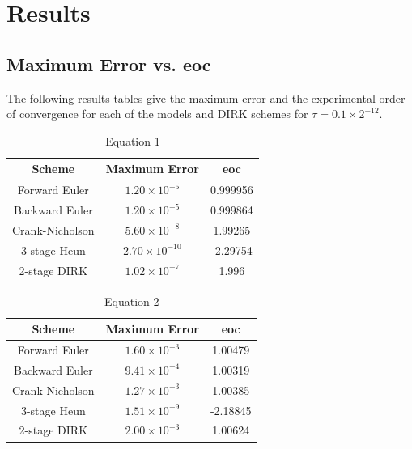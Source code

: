\documentclass[letterpaper,12pt]{article}
\begin{document}
\section{Results}		

\subsection{Maximum Error vs. eoc}

The following results tables give the maximum error and the experimental order of convergence for each of the models and DIRK schemes for $\tau = 0.1 \times 2^{-12}$.

\begin{table}[ht]
\caption{Equation 1} %
\centering %
\begin{tabular}{c c c} %
\hline\hline %
Scheme & Maximum Error & eoc \\ [0.5ex] %
\hline %

      Forward Euler &      $1.20 \times 10^{-5}$ & 0.999956	\\
     Backward Euler &      $1.20 \times 10^{-5}$ & 0.999864 \\
  	Crank-Nicholson &      $5.60 \times 10^{-8}$ & 1.99265  \\
   	   3-stage Heun &     $2.70 \times 10^{-10}$ & -2.29754 \\
       2-stage DIRK &      $1.02 \times 10^{-7}$ & 1.996 \\


\hline %
\end{tabular}
\label{table:nonlin} %
\end{table}


\begin{table}[ht]
\caption{Equation 2} %
\centering %
\begin{tabular}{c c c} %
\hline\hline %
Scheme & Maximum Error & eoc \\ [0.5ex] %
\hline %

      Forward Euler &      $1.60 \times 10^{-3}$ & 1.00479 \\
     Backward Euler &      $9.41 \times 10^{-4}$ & 1.00319 \\
  	Crank-Nicholson &      $1.27 \times 10^{-3}$ & 1.00385 \\
   	   3-stage Heun &      $1.51 \times 10^{-9}$ & -2.18845 \\
       2-stage DIRK &      $2.00 \times 10^{-3}$ & 1.00624 \\


\hline %
\end{tabular}
\label{table:nonlin} %
\end{table}
\end{document}
